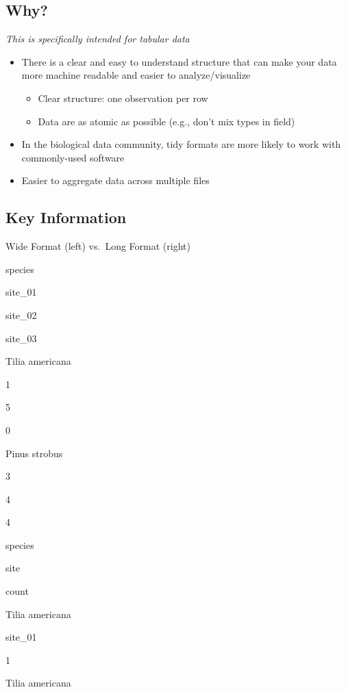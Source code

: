 \documentclass[
  oneside]{book}
\providecommand{\tightlist}{%
  \setlength{\itemsep}{0pt}\setlength{\parskip}{0pt}}
\begin{document}
\hypertarget{why-1}{%
\subsection{Why?}\label{why-1}}

\emph{This is specifically intended for tabular data}

\begin{itemize}
\tightlist
\item
  There is a clear and easy to understand structure that can make your data more machine readable and easier to analyze/visualize

  \begin{itemize}
  \tightlist
  \item
    Clear structure: one observation per row
  \item
    Data are as atomic as possible (e.g., don't mix types in field)
  \end{itemize}
\item
  In the biological data community, tidy formats are more likely to work with commonly-used software
\item
  Easier to aggregate data across multiple files
\end{itemize}

\hypertarget{key-information-1}{%
\subsection{Key Information}\label{key-information-1}}

\label{tab:tidyformat}Wide Format (left) vs.~Long Format (right)

species

site\_01

site\_02

site\_03

Tilia americana

1

5

0

Pinus strobus

3

4

4

species

site

count

Tilia americana

site\_01

1

Tilia americana
\end{document}

